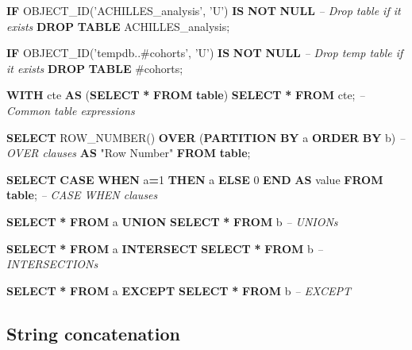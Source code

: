 \documentclass[
]{article}
\newenvironment{Shaded}{\begin{snugshade}}{\end{snugshade}}
\newcommand{\CommentTok}[1]{\textcolor[rgb]{0.56,0.35,0.01}{\textit{#1}}}
\newcommand{\ControlFlowTok}[1]{\textcolor[rgb]{0.13,0.29,0.53}{\textbf{#1}}}
\newcommand{\DecValTok}[1]{\textcolor[rgb]{0.00,0.00,0.81}{#1}}
\newcommand{\FunctionTok}[1]{\textcolor[rgb]{0.00,0.00,0.00}{#1}}
\newcommand{\KeywordTok}[1]{\textcolor[rgb]{0.13,0.29,0.53}{\textbf{#1}}}
\newcommand{\NormalTok}[1]{#1}
\newcommand{\OperatorTok}[1]{\textcolor[rgb]{0.81,0.36,0.00}{\textbf{#1}}}
\newcommand{\OtherTok}[1]{\textcolor[rgb]{0.56,0.35,0.01}{#1}}
\newcommand{\StringTok}[1]{\textcolor[rgb]{0.31,0.60,0.02}{#1}}
\begin{document}
\begin{Shaded}
\begin{Highlighting}[]
\ControlFlowTok{IF}\NormalTok{ OBJECT_ID(}\StringTok{'ACHILLES_analysis'}\NormalTok{, }\StringTok{'U'}\NormalTok{) }\KeywordTok{IS} \KeywordTok{NOT} \KeywordTok{NULL}          \CommentTok{-- Drop table if it exists}
  \KeywordTok{DROP} \KeywordTok{TABLE}\NormalTok{ ACHILLES_analysis;}
  
\ControlFlowTok{IF}\NormalTok{ OBJECT_ID(}\StringTok{'tempdb..#cohorts'}\NormalTok{, }\StringTok{'U'}\NormalTok{) }\KeywordTok{IS} \KeywordTok{NOT} \KeywordTok{NULL}           \CommentTok{-- Drop temp table if it exists}
  \KeywordTok{DROP} \KeywordTok{TABLE}\NormalTok{ #cohorts;  }

\KeywordTok{WITH}\NormalTok{ cte }\KeywordTok{AS}\NormalTok{ (}\KeywordTok{SELECT} \OperatorTok{*} \KeywordTok{FROM} \KeywordTok{table}\NormalTok{) }\KeywordTok{SELECT} \OperatorTok{*} \KeywordTok{FROM}\NormalTok{ cte;        }\CommentTok{-- Common table expressions}

\KeywordTok{SELECT} \FunctionTok{ROW_NUMBER}\NormalTok{() }\KeywordTok{OVER}\NormalTok{ (}\KeywordTok{PARTITION} \KeywordTok{BY}\NormalTok{ a }\KeywordTok{ORDER} \KeywordTok{BY}\NormalTok{ b)        }\CommentTok{-- OVER clauses}
  \KeywordTok{AS} \OtherTok{"Row Number"} \KeywordTok{FROM} \KeywordTok{table}\NormalTok{;}
  
\KeywordTok{SELECT} \ControlFlowTok{CASE} \ControlFlowTok{WHEN}\NormalTok{ a}\OperatorTok{=}\DecValTok{1} \ControlFlowTok{THEN}\NormalTok{ a }\ControlFlowTok{ELSE} \DecValTok{0} \ControlFlowTok{END} \KeywordTok{AS} \FunctionTok{value} \KeywordTok{FROM} \KeywordTok{table}\NormalTok{; }\CommentTok{-- CASE WHEN clauses}

\KeywordTok{SELECT} \OperatorTok{*} \KeywordTok{FROM}\NormalTok{ a }\KeywordTok{UNION} \KeywordTok{SELECT} \OperatorTok{*} \KeywordTok{FROM}\NormalTok{ b                       }\CommentTok{-- UNIONs}

\KeywordTok{SELECT} \OperatorTok{*} \KeywordTok{FROM}\NormalTok{ a }\KeywordTok{INTERSECT} \KeywordTok{SELECT} \OperatorTok{*} \KeywordTok{FROM}\NormalTok{ b                   }\CommentTok{-- INTERSECTIONs}

\KeywordTok{SELECT} \OperatorTok{*} \KeywordTok{FROM}\NormalTok{ a }\KeywordTok{EXCEPT} \KeywordTok{SELECT} \OperatorTok{*} \KeywordTok{FROM}\NormalTok{ b                      }\CommentTok{-- EXCEPT}
\end{Highlighting}
\end{Shaded}

\hypertarget{string-concatenation}{%
\subsection{String concatenation}\label{string-concatenation}}
\end{document}
